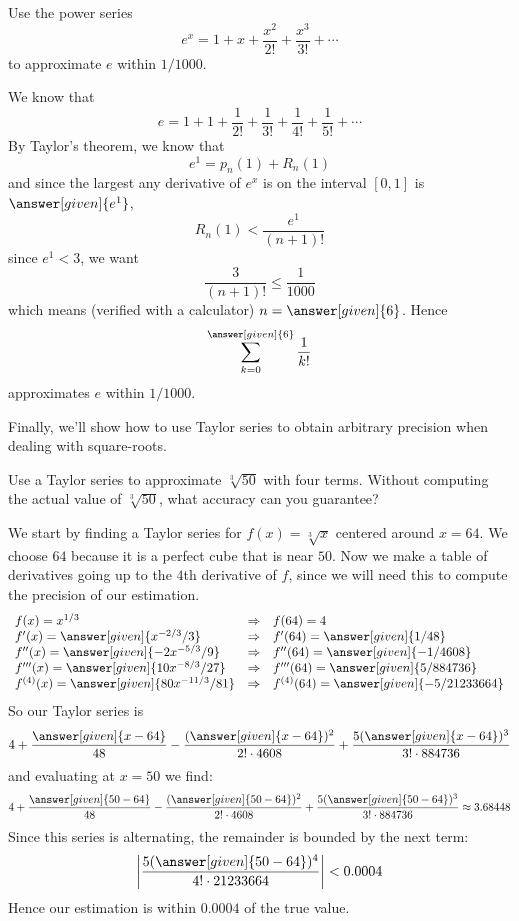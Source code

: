 \documentclass{ximera}
\begin{document}
\begin{example}
  Use the power series 
  \[
  e^x = 1+x+\frac{x^2}{2!}+\frac{x^3}{3!}+\cdots
  \]
  to approximate $e$ within $1/1000$.
  \begin{explanation}
    We know that
	\[
	e = 1+1+\frac{1}{2!}+\frac{1}{3!}+\frac{1}{4!}+\frac{1}{5!}+\cdots
	\]
        By Taylor's theorem, we know that
        \[
        e^1 = p_n(1) + R_n(1)
        \]
        and since the largest any derivative of $e^x$ is on the
        interval $[0,1]$ is $\answer[given]{e^1}$,
        \[
        R_n(1) < \frac{e^1}{(n+1)!} 
        \]
        since $e^1<3$, we want
        \[
        \frac{3}{(n+1)!} \le \frac{1}{1000}
        \]
        which means (verified with a calculator) $n=\answer[given]{6}$. Hence
        \[
        \sum_{k=0}^{\answer[given]{6}}\frac{1}{k!}
        \]
        approximates $e$ within $1/1000$.
  \end{explanation}
\end{example}

Finally, we'll show how to use Taylor series to obtain arbitrary
precision when dealing with square-roots.

\begin{example}
  Use a Taylor series to approximate $\sqrt[3]{50}$ with four
  terms. Without computing the actual value of $\sqrt[3]{50}$, what
  accuracy can you guarantee?
  \begin{explanation}
    We start by finding a Taylor series for $f(x) = \sqrt[3]{x}$
    centered around $x=64$. We choose $64$ because it is a perfect
    cube that is near $50$. Now we make a table of derivatives going
    up to the $4$th derivative of $f$, since we will need this to
    compute the precision of our estimation.
    \[
    \begin{array}{lcl}
      f(x) = x^{1/3} & \Rightarrow &f(64) = 4\\
      f'(x) = \answer[given]{x^{-2/3}/3} & \Rightarrow & f'(64) = \answer[given]{1/48}\\
      f''(x) = \answer[given]{-2x^{-5/3}/9} &\Rightarrow &f''(64) = \answer[given]{-1/4608}\\
      f'''(x) = \answer[given]{10x^{-8/3}/27} &\Rightarrow &f'''(64) = \answer[given]{5/884736}\\
      f^{(4)}(x) = \answer[given]{80 x^{-11/3}/81} &\Rightarrow &f^{(4)}(64) = \answer[given]{-5/21233664}
    \end{array}
    \]
    So our Taylor series is
    \[
    4 + \frac{\answer[given]{x-64}}{48} - \frac{(\answer[given]{x-64})^2}{2!\cdot 4608} + \frac{5(\answer[given]{x-64})^3}{3!\cdot 884736}
    \]
    and evaluating at $x=50$ we find:
    \[
    4 + \frac{\answer[given]{50-64}}{48} - \frac{(\answer[given]{50-64})^2}{2!\cdot 4608} + \frac{5(\answer[given]{50-64})^3}{3!\cdot 884736} \approx 3.68448
    \]
    Since this series is alternating, the remainder is bounded by the next term:
    \[
    \left|\frac{5(\answer[given]{50-64})^4}{4!\cdot 21233664}\right| < 0.0004 
    \]
    Hence our estimation is within $0.0004$ of the true value.
  \end{explanation}
\end{example}
\end{document}
